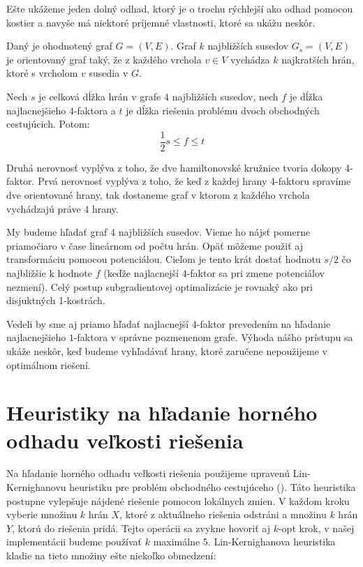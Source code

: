 Ešte ukážeme jeden dolný odhad, ktorý je o trochu rýchlejší ako odhad pomocou kostier a navyše má
niektoré príjemné vlastnosti, ktoré sa ukážu neskôr.

\begin{definicia}
Daný je ohodnotený graf $G = (V, E)$. Graf $k$ najbližších susedov $G_s = (V, E)$ je orientovaný
graf taký, že z každého vrchola $v \in V$ vychádza $k$ najkratších hrán, ktoré s vrcholom $v$
susedia v $G$. 
\end{definicia}

\begin{lema}
Nech $s$ je celková dĺžka hrán v grafe $4$ najbližších susedov, nech $f$ je dĺžka najlacnejšieho
$4$-faktora a $t$ je dĺžka riešenia problému dvoch obchodných cestujúcich. Potom:
$$ \frac{1}{2} s \leq f \leq t$$
\end{lema}

\begin{dokaz}
Druhá nerovnosť vyplýva z toho, že dve hamiltonovské kružnice tvoria dokopy 4-faktor.
Prvá nerovnosť vyplýva z toho, že keď z každej hrany 4-faktoru spravíme dve orientované hrany, tak
dostaneme graf v ktorom z každého vrchola vychádzajú práve 4 hrany.
\end{dokaz}

My budeme hľadať graf $4$ najbližších susedov. Vieme ho nájsť pomerne priamočiaro v čase lineárnom
od počtu hrán. Opäť môžeme použiť aj transformáciu pomocou potenciálou. Cieľom je tento krát
dostať hodnotu $s/2$ čo najbližšie k hodnote $f$ (keďže najlacnejší 4-faktor sa pri zmene
potenciálov nezmení). Celý postup subgradientovej optimalizácie je rovnaký ako pri disjuktných
1-kostrách.

\begin{poznamka}
Vedeli by sme aj priamo hľadať najlacnejší $4$-faktor prevedením na hľadanie najlacnejšieho
$1$-faktora v správne pozmenenom grafe. Výhoda nášho prístupu sa ukáže neskôr, keď budeme
vyhľadávať hrany, ktoré zaručene nepoužijeme v optimálnom riešení.
\end{poznamka}

\section{Heuristiky na hľadanie horného odhadu veľkosti riešenia}

Na hľadanie horného odhadu veľkosti riešenia použijeme upravenú Lin-Kernighanovu heuristiku pre
problém obchodného cestujúceho (\cite{link}). Táto heuristika postupne vylepšuje nájdené
riešenie pomocou lokálnych zmien. V každom kroku vyberie množinu $k$ hrán $X$, ktoré z aktuálneho
riešenia odstráni a množinu $k$ hrán $Y$, ktorú do riešenia pridá. Tejto operácii sa zvykne
hovoriť aj $k$-opt krok, v našej implementácii budeme používať $k$ maximálne 5.
Lin-Kernighanova heuristika kladie na tieto množiny ešte niekoľko obmedzení:

